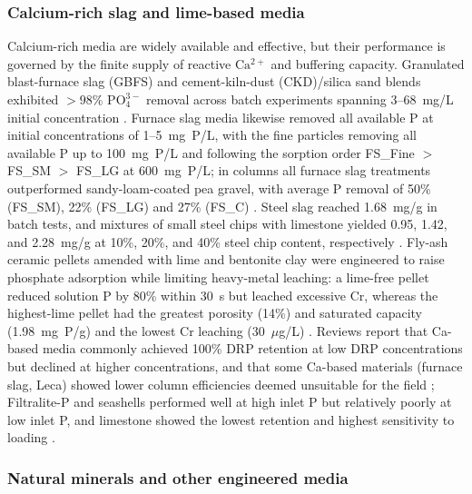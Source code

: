 \documentclass[11pt]{article}
\begin{document}
\subsubsection{Calcium-rich slag and lime-based media}

Calcium-rich media are widely available and effective, but their performance is
governed by the finite supply of reactive $\mathrm{Ca^{2+}}$ and buffering
capacity. Granulated blast-furnace slag (GBFS) and cement-kiln-dust (CKD)/silica
sand blends exhibited $>98\%$ $\mathrm{PO_4^{3-}}$ removal across batch experiments
spanning 3--68~mg/L initial concentration \parencite{Agrawal2011}. Furnace slag
media likewise removed all available P at initial concentrations of 1--5~mg~P/L,
with the fine particles removing all available P up to 100~mg~P/L and following
the sorption order FS\_Fine $>$ FS\_SM $>$ FS\_LG at 600~mg~P/L; in columns all
furnace slag treatments outperformed sandy-loam-coated pea gravel, with average
P removal of 50\% (FS\_SM), 22\% (FS\_LG) and 27\% (FS\_C) \parencite{Sanford2016}.
Steel slag reached 1.68~mg/g in batch tests, and mixtures of small steel chips
with limestone yielded 0.95, 1.42, and 2.28~mg/g at 10\%, 20\%, and 40\% steel
chip content, respectively \parencite{Sellner2019b}. Fly-ash ceramic pellets
amended with lime and bentonite clay were engineered to raise phosphate
adsorption while limiting heavy-metal leaching: a lime-free pellet reduced
solution P by 80\% within 30~s but leached excessive Cr, whereas the highest-lime
pellet had the greatest porosity (14\%) and saturated capacity (1.98~mg~P/g) and
the lowest Cr leaching (30~$\mu$g/L) \parencite{Li2017}. Reviews report that
Ca-based media commonly achieved 100\% DRP retention at low DRP concentrations but
declined at higher concentrations, and that some Ca-based materials (furnace slag,
Leca) showed lower column efficiencies deemed unsuitable for the field
\parencite{Mendes2022}; Filtralite-P and seashells performed well at high inlet P
but relatively poorly at low inlet P, and limestone showed the lowest retention
and highest sensitivity to loading \parencite{Pugliese2023}.

\subsubsection{Natural minerals and other engineered media}
\end{document}
